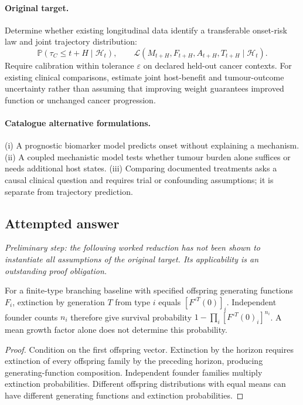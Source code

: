 \documentclass[11pt]{article}
\begin{document}
\paragraph{Original target.}
Determine whether existing longitudinal data identify a transferable onset-risk law and joint trajectory distribution:
    \[\mathbb{P}(\tau_C\leq t+H\mid\mathcal H_t),\qquad
    \mathcal L(M_{t+H},F_{t+H},A_{t+H},T_{t+H}\mid\mathcal H_t).\]
    Require calibration within tolerance $\varepsilon$ on declared held-out cancer contexts. For existing clinical comparisons, estimate joint host-benefit and tumour-outcome uncertainty rather than assuming that improving weight guarantees improved function or unchanged cancer progression.
\paragraph{Catalogue alternative formulations.}
(i) A prognostic biomarker model predicts onset without explaining a mechanism. (ii) A coupled mechanistic model tests whether tumour burden alone suffices or needs additional host states. (iii) Comparing documented treatments asks a causal clinical question and requires trial or confounding assumptions; it is separate from trajectory prediction.
\subsection{Attempted answer}
\noindent\emph{Preliminary step: the following worked reduction has not been shown to instantiate all assumptions of the original target. Its applicability is an outstanding proof obligation.}

\begin{proposition}
For a finite-type branching baseline with specified offspring generating functions $F_i$, extinction by generation $T$ from type $i$ equals $[F^{\circ T}(0)]_i$. Independent founder counts $n_i$ therefore give survival probability $1-\prod_i[F^{\circ T}(0)_i]^{n_i}$. A mean growth factor alone does not determine this probability.
\end{proposition}
\begin{proof}
Condition on the first offspring vector. Extinction by the horizon requires extinction of every offspring family by the preceding horizon, producing generating-function composition. Independent founder families multiply extinction probabilities. Different offspring distributions with equal means can have different generating functions and extinction probabilities.
\end{proof}
\end{document}
